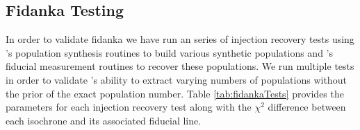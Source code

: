 \subsection{Fidanka Testing}
In order to validate fidanka we have run an series of injection recovery tests
using \fidanka's population synthesis routines to build various synthetic
populations and \fidanka's fiducial measurement routines to recover these
populations. We run multiple tests in order to validate \fidanka's ability to
extract varying numbers of populations without the prior of the exact population
number. Table \ref{tab:fidankaTests} provides the parameters for each injection recovery
test along with the $\chi^{2}$ difference between each isochrone and its associated fiducial line.
